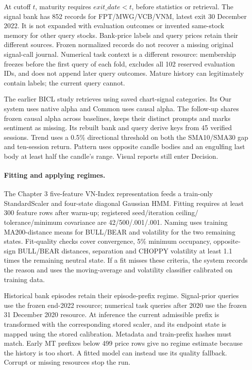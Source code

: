 At cutoff $t$, maturity requires $exit\_date<t$, before statistics or
retrieval. The signal bank has 852 records for FPT/MWG/VCB/VNM, latest exit
30 December 2022. It is not expanded with evaluation outcomes or invented
same-stock memory for other query stocks. Bank-price labels and query
prices retain their different sources. Frozen normalized records do not
recover a missing original signal-call journal. Numerical task context is
a different resource: membership freezes before the first query of each
fold, excludes all 102 reserved evaluation IDs, and does not append later
query outcomes. Mature history can legitimately contain labels; the
current query cannot.

The earlier BICL study retrieves using saved chart-signal categories. Its
Our system uses native alpha and Common uses causal alpha. The follow-up
shares frozen causal alpha across baselines, keeps their distinct prompts
and marks sentiment as missing. Its rebuilt bank and query derive keys
from 45 verified sessions. Trend uses a 0.5\% directional threshold on
both the SMA10/SMA30 gap and ten-session return. Pattern uses opposite
candle bodies and an engulfing last body at least half the candle's range.
Visual reports still enter Decision.

\paragraph{Fitting and applying regimes.}
The Chapter 3 five-feature VN-Index representation feeds a train-only
StandardScaler and four-state diagonal Gaussian HMM. Fitting requires at
least 300 feature rows after warm-up; registered seed/iteration ceiling/
tolerance/minimum covariance are 42/500/.001/.001. Naming uses training
MA200-distance means for BULL/BEAR and volatility for the two remaining
states. Fit-quality checks cover convergence, 5\% minimum occupancy,
opposite-sign BULL/BEAR distances, separation and CHOPPY volatility at
least 1.1 times the remaining neutral state. If a fit misses these
criteria, the system records the reason and uses the moving-average and
volatility classifier calibrated on training data.

Historical bank episodes retain their episode-prefix regime. Signal-prior
queries use the frozen end-2022 resource; numerical task queries after
2020 use the frozen 31 December 2020 resource. At inference the current
admissible prefix is transformed with the corresponding stored scaler,
and its endpoint state is mapped using the stored calibration. Metadata
and train-prefix hashes must match. Early MT prefixes below 499 price
rows give no regime estimate because the history is too short. A fitted
model can instead use its quality fallback. Corrupt or missing resources
stop the run.

